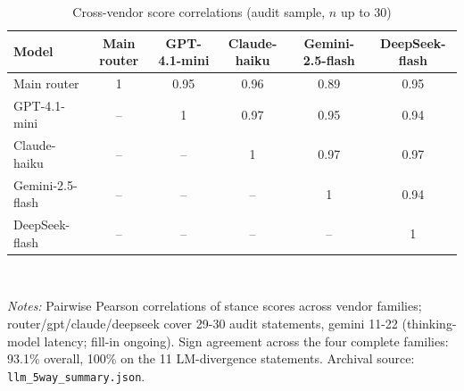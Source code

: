 \begin{table}[!tbp]
\centering\small
\caption{Cross-vendor score correlations (audit sample, $n$ up to 30)}
\label{tab:a2}
\begin{tabular}{lccccc}
\toprule
Model & Main router & GPT-4.1-mini & Claude-haiku & Gemini-2.5-flash & DeepSeek-flash \\
\midrule
Main router & 1 & 0.95 & 0.96 & 0.89 & 0.95 \\
GPT-4.1-mini & -- & 1 & 0.97 & 0.95 & 0.94 \\
Claude-haiku & -- & -- & 1 & 0.97 & 0.97 \\
Gemini-2.5-flash & -- & -- & -- & 1 & 0.94 \\
DeepSeek-flash & -- & -- & -- & -- & 1 \\
\bottomrule
\end{tabular}
\\[2pt]\begin{minipage}{0.92\linewidth}\footnotesize\emph{Notes:} Pairwise Pearson correlations of stance scores across vendor families; router/gpt/claude/deepseek cover 29-30 audit statements, gemini 11-22 (thinking-model latency; fill-in ongoing). Sign agreement across the four complete families: 93.1\% overall, 100\% on the 11 LM-divergence statements. Archival source: \texttt{llm\_5way\_summary.json}.\end{minipage}
\end{table}
